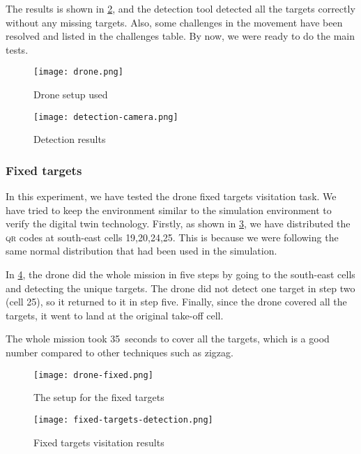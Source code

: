 \documentclass[../main.tex]{subfiles}
\begin{document}
The results is shown in \cref{fig:detection-camera}, 
and the detection tool detected all the targets correctly 
without any missing targets. Also, some challenges 
in the movement have been resolved and listed in 
the challenges table. By now, we were ready to do the main tests.

\begin{figure}[H]
	\centering
	\texttt{[image: drone.png]}
	\caption{Drone setup used}
	\label{fig:experiment-drone}
\end{figure} 

\begin{figure}[H]
	\centering
	\texttt{[image: detection-camera.png]}
	\caption{Detection results}
	\label{fig:detection-camera}
\end{figure}

\subsubsection{Fixed targets}

In this experiment, we have tested the drone fixed targets
visitation task. We have tried to keep the environment similar
to the simulation environment to verify the digital twin technology.
Firstly, as shown in \cref{fig:targets-location},
we have distributed the \textsc{qr} codes at south-east cells 
{19,20,24,25}. This is because we were following 
the same normal distribution that had been used in the simulation.

In \cref{fig:fixed-location-detection-camera},
the drone did the whole mission in five steps by going
to the south-east cells and detecting the unique targets. 
The drone did not detect one target in 
step two (cell 25), so it returned to it in step five. Finally,
since the drone covered all the targets, it 
went to land at the original take-off cell.

The whole mission took \SI{35}{seconds} to cover all the targets,
which is a good number compared to other techniques such as zigzag.

\begin{figure}[H]
	\centering
	\texttt{[image: drone-fixed.png]}
	\caption{The setup for the fixed targets}
	\label{fig:targets-location}
\end{figure}


\begin{figure}[H]
	\centering
	\texttt{[image: fixed-targets-detection.png]}
	\caption{Fixed targets visitation results}
	\label{fig:fixed-location-detection-camera}
\end{figure}
\end{document}

